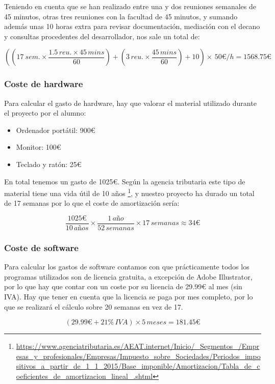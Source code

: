 Teniendo en cuenta que se han realizado entre una y dos reuniones semanales de 45 minutos, otras tres reuniones con la facultad de 45 minutos, y sumando además unas 10 horas extra para revisar documentación, mediación con el decano y consultas procedentes del desarrollador, nos sale un total de:

\[ \left (  \left ( 17\: sem. \times \frac{1.5\, reu.\times 45\, mins}{60} \right )+\left ( 3\, reu. \times \frac{45\, mins}{60} \right ) + 10\right )\times\, 50\euro/h = 1568.75\euro \]


\subsubsection{Coste de hardware}

Para calcular el gasto de hardware, hay que valorar el material utilizado durante el proyecto por el alumno:
\begin{itemize}
	\item Ordenador portátil: 900€
	\item Monitor: 100€
	\item Teclado y ratón: 25€
\end{itemize}

En total tenemos un gasto de 1025€. Según la agencia tributaria este tipo de material tiene una vida útil de 10 años \footnote{\url{https://www.agenciatributaria.es/AEAT.internet/Inicio/_Segmentos_/Empresas_y_profesionales/Empresas/Impuesto_sobre_Sociedades/Periodos_impositivos_a_partir_de_1_1_2015/Base_imponible/Amortizacion/Tabla_de_coeficientes_de_amortizacion_lineal_.shtml}}, y nuestro proyecto ha durado un total de 17 semanas por lo que el coste de amortización sería:

\[\frac{1025\euro}{10\, a\textit{ñ}os} \times \frac{1\, a\textit{ñ}o}{52\, semanas} \times 17\, semanas \approx  34\euro \]

\subsubsection{Coste de software}

Para calcular los gastos de software contamos con que prácticamente todos los programas utilizados son de licencia gratuita, a excepción de Adobe Illustrator, por lo que hay que contar con un coste por su licencia de 29.99€ al mes (sin IVA). Hay que tener en cuenta que la licencia se paga por mes completo, por lo que se realizará el cálculo sobre 20 semanas en vez de 17.

\[ (29.99 \euro + 21\% \, IVA) \times 5\, meses = 181.45 \euro\]

